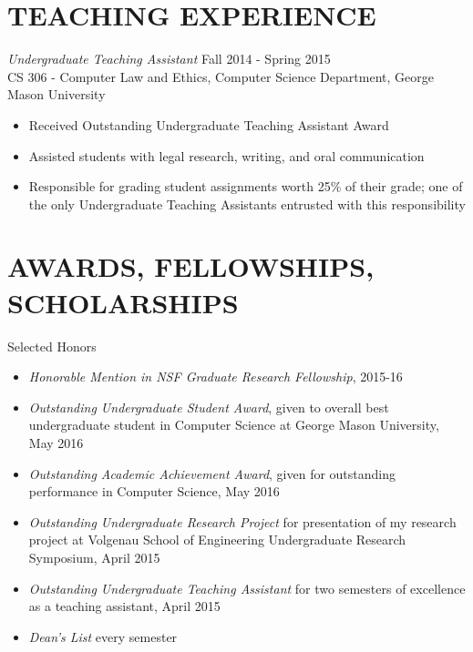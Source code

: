 \documentclass[margin, 10pt]{res} %
\begin{document}
\begin{resume}
\section{TEACHING EXPERIENCE}

{\sl Undergraduate Teaching Assistant} \hfill Fall 2014 - Spring 2015 \\
CS 306 - Computer Law and Ethics, Computer Science Department, George Mason University
\begin{itemize} \itemsep -2pt %
\item Received Outstanding Undergraduate Teaching Assistant Award 
\item Assisted students with legal research, writing, and oral communication
\item Responsible for grading student assignments worth 25\% of their grade; one of the only Undergraduate Teaching Assistants entrusted with this responsibility
\end{itemize} 


\section{AWARDS, FELLOWSHIPS, SCHOLARSHIPS} 

Selected Honors
\begin{itemize} \itemsep -2pt %
\item {\sl Honorable Mention in NSF Graduate Research Fellowship}, 2015-16
\item {\sl Outstanding Undergraduate Student Award}, given to overall best undergraduate student in Computer Science at George Mason University, May 2016
\item {\sl Outstanding Academic Achievement Award}, given for outstanding performance in Computer Science, May 2016
\item {\sl Outstanding Undergraduate Research Project} for presentation of my research project at Volgenau School of Engineering Undergraduate Research Symposium, April 2015
\item {\sl Outstanding Undergraduate Teaching Assistant} for two semesters of excellence as a teaching assistant, April 2015
\item {\sl Dean's List} every semester
\end{itemize}


\end{resume}
\end{document}
